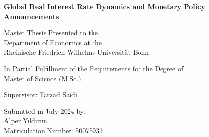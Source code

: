 \begin{titlepage}
    \begin{center}
        \vspace*{2cm}
            
        \LARGE
        \textbf{Global Real Interest Rate Dynamics and Monetary Policy Announcements}
            
        \vspace{3cm}

        \large
        Master Thesis Presented to the \\ Department of Economics at the \\
        Rheinische Friedrich-Wilhelms-Universität Bonn

        \vspace{1.5cm}

        In Partial Fulfillment of the Requirements for the Degree of \\
        Master of Science (M.Sc.)

        \vfill

        Supervisor: Farzad Saidi

        \vspace{1cm}

        Submitted in July 2024 by:\\
        Alper Yıldırım \\
        Matriculation Number: 50075931
            
    \end{center}
\end{titlepage}